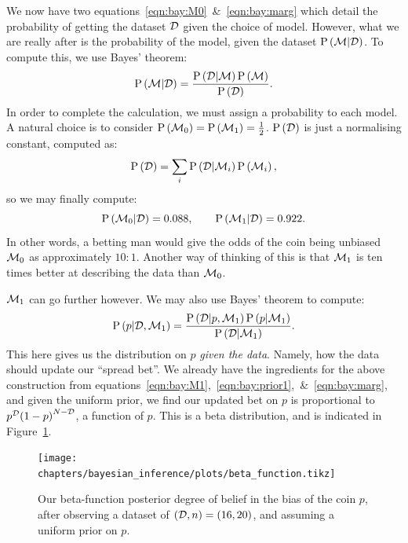 We now have two equations~\eqref{eqn:bay:M0}~\&~\eqref{eqn:bay:marg} which detail the probability of getting the dataset \(\mathcal{D}\) given the choice of model. However, what we are really after is the probability of the model, given the dataset \(\mathrm{P}\left(\mathcal{M}\middle|\mathcal{D}\right)\). To compute this, we use Bayes' theorem:
\begin{equation}
  \mathrm{P}\left(\mathcal{M}\middle|\mathcal{D}\right) = \frac{\mathrm{P}\left(\mathcal{D}\middle|\mathcal{M}\right)\mathrm{P}\left(\mathcal{M}\right)}{\mathrm{P}\left(\mathcal{D}\right)}.
  \label{eqn:bay:bay_md}
\end{equation}
In order to complete the calculation, we must assign a probability to each model. A natural choice is to consider \(\mathrm{P}\left(\mathcal{M}_0\right)=\mathrm{P}\left(\mathcal{M}_1\right)=\frac{1}{2}\). \(\mathrm{P}\left(\mathcal{D}\right)\) is just a normalising constant, computed as:
\begin{equation}
  \mathrm{P}\left(\mathcal{D}\right) = \sum_i \mathrm{P}\left(\mathcal{D}\middle|\mathcal{M}_i\right)\mathrm{P}\left(\mathcal{M}_i\right), 
  \label{eqn:bay:norm}
\end{equation}
so we may finally compute:
\begin{equation}
  \mathrm{P}\left(\mathcal{M}_0\middle|\mathcal{D}\right) = 0.088, \qquad
  \mathrm{P}\left(\mathcal{M}_1\middle|\mathcal{D}\right) = 0.922.
  \label{eqn:bay:comp}
\end{equation}
In other words, a betting man would give the odds of the coin being unbiased \(\mathcal{M}_0\) as approximately \(10:1\). Another way of thinking of this is that \(\mathcal{M}_1\) is ten times better at describing the data than \(\mathcal{M}_0\).

\(\mathcal{M}_1\) can go further however. We may also use Bayes' theorem to compute:
\begin{equation}
  \mathrm{P}\left(p\middle|\mathcal{D},\mathcal{M}_1\right) = \frac{\mathrm{P}\left(\mathcal{D}\middle|p,\mathcal{M}_1\right)\mathrm{P}\left(p\middle|\mathcal{M}_1\right)}{\mathrm{P}\left(\mathcal{D}\middle|\mathcal{M}_1\right)}.
  \label{eqn:bay:bay_p}
\end{equation}
This here gives us the distribution on \(p\) {\em given the data}. Namely, how the data should update our ``spread bet''. We already have the ingredients for the above construction from equations~\eqref{eqn:bay:M1},~\eqref{eqn:bay:prior1},~\&~\eqref{eqn:bay:marg}, and given the uniform prior, we find our updated bet on \(p\) is proportional to \(p^{\mathcal{D}}{(1-p)}^{N-\mathcal{D}}\), a function of \(p\). This is a beta distribution, and is indicated in Figure~\ref{fig:bay:beta}.

\begin{figure}[tp]
  \centering
  \texttt{[image: chapters/bayesian\_inference/plots/beta\_function.tikz]}
  \caption{%
  Our beta-function posterior degree of belief in the bias of the coin \(p\), after observing a dataset of \((\mathcal{D},n)=(16,20)\), and assuming a uniform prior on \(p\).\label{fig:bay:beta}
}
\end{figure}

